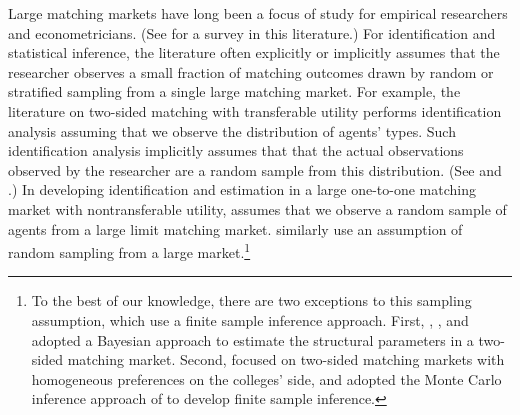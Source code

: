 \documentclass[12pt, fullpage]{amsart}
\theoremstyle{definition}
\theoremstyle{definition}
\theoremstyle{definition}
\begin{document}
\begin{bibunit}[econometrica]
    Large matching markets have long been a focus of study for empirical researchers and econometricians. (See \cite{Chiappori/Salanie:16:JEL} for a survey in this literature.) For identification and statistical inference, the literature often explicitly or implicitly assumes that the researcher observes a small fraction of matching outcomes drawn by random or stratified sampling from a single large matching market. For example, the literature on two-sided matching with transferable utility performs identification analysis assuming that we observe the distribution of agents' types. Such identification analysis implicitly assumes that that the actual observations observed by the researcher are a random sample from this distribution. (See \cite{Choo/Siow:06:JPE} and \cite{Galichon/Salanie:2021}.) In developing identification and estimation in a large one-to-one matching market with nontransferable utility, \cite{Menzel:2015:Eca} assumes that we observe a random sample of agents from a large limit matching market. \cite{DelBoca/Flinn:14:JET} similarly use an assumption of random sampling from a large market.\footnote{To the best of our knowledge, there are two exceptions to this sampling assumption, which use a finite sample inference approach. First, \cite{Logan/Hoff/Newton:2008:JASA}, \cite{Sorensen:2007:JF}, \cite{Aue/Klein/Ortega:2020:WP} and \cite{He/Sinha/Sun:22:WP} adopted a Bayesian approach to estimate the structural parameters in a two-sided matching market. Second, \cite{Kim/Schwartz/Song/Whang:19:Econometrics} focused on two-sided matching markets with homogeneous preferences on the colleges' side, and adopted the Monte Carlo inference approach of \cite{Dufour:06:JOE} to develop finite sample inference.}
    

\end{bibunit}
\end{document}
